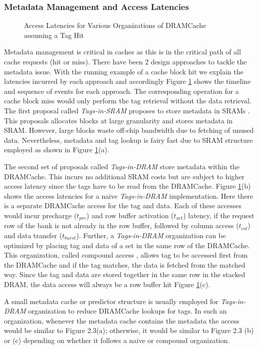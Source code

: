 \subsubsection{Metadata Management and Access Latencies}
\begin{figure}[!htb]
	\centering
	\def\svgwidth{\columnwidth}
	
	\caption{Access Latencies for Various Organizations of DRAMCache assuming a Tag Hit}
	\label{fig:dramcache-lat}
\end{figure}
Metadata management is critical in caches as this is in the critical path of all cache requests (hit or miss). There have been 2 design approaches to tackle the metadata issue. With the running example of a cache block hit we explain the latencies incurred by each approach and accordingly Figure \ref{fig:dramcache-lat} shows the timeline and sequence of events for each approach. The corresponding operation for a cache block miss would only perform the tag retrieval without the data retrieval. The first proposal called \textit{Tags-in-SRAM} proposes to store metadata in SRAMs \cite{footprint}. This proposals allocates blocks at large granularity and stores metadata in SRAM. However, large blocks waste off-chip bandwidth due to fetching of unused data. Nevertheless, metadata and tag lookup is fairy fast due to SRAM structure employed as shown in Figure \ref{fig:dramcache-lat}(a). 
\par The second set of proposals called \textit{Tags-in-DRAM} \cite{loh-hill,alloy,bimodal,atcache} store metadata within the DRAMCache. This incurs no additional SRAM costs but are subject to higher access latency since the tags have to be read from the DRAMCache. Figure \ref{fig:dramcache-lat}(b) shows the access latencies for a naive \textit{Tags-in-DRAM} implementation. Here there is a separate DRAMCache access for the tag and data. Each of these accesses would incur precharge ($t_{pre}$) and row buffer activation ($t_{act}$) latency, if the request row of the bank is not already in the row buffer, followed by column access ($t_{col}$) and data transfer ($t_{burst}$). Further, a \textit{Tags-in-DRAM} organization can be optimized by placing tag and data of a set in the same row of the DRAMCache. This organization, called compound access \cite{loh-hill}, allows tag to be accessed first from the DRAMCache and if the tag matches, the data is fetched from the matched way. Since the tag and data are stored together in the same row in the stacked DRAM, the data access will always be a row buffer hit Figure \ref{fig:dramcache-lat}(c). 
\par A small metadata cache \cite{atcache} or predictor \cite{loh-hill} structure is usually employed for \textit{Tags-in-DRAM} organization to reduce DRAMCache lookups for tags. In such an organization, whenever the metadata cache contains the metadata the access would be similar to Figure 2.3(a); otherwise, it would be similar to Figure 2.3 (b) or (c) depending on whether it follows a naive or compound organization. 
